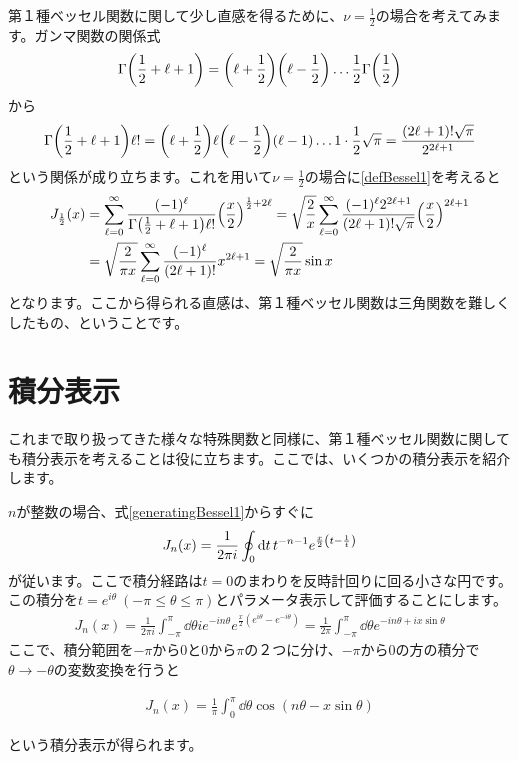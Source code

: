 \documentclass[report,paper=a4, fontsize=12pt, line_length=16cm, number_of_lines=33,dvipdfmx]{jlreq}
\newenvironment{important}{\begin{tcolorbox}[
  colback = white,
  colframe = red!35,
  boxrule = 2mm,
  fonttitle = \bfseries,
  after = \noindent] }{\end{tcolorbox}}
\numberwithin{equation}{section}
\begin{document}
第１種ベッセル関数に関して少し直感を得るために、$\nu=\frac12$の場合を考えてみます。ガンマ関数の関係式
\begin{align}
  \Gamma\qty(\frac12+\ell+1)=\qty(\ell+\frac12)\qty(\ell-\frac12)\dots \frac12 \Gamma\qty(\frac12)
\end{align}
から
\begin{align}
  \Gamma\qty(\frac12+\ell+1)\ell!=\qty(\ell+\frac12)\ell\qty(\ell-\frac12)(\ell-1)\dots 1\cdot\frac12 \sqrt{\pi}
  =\frac{(2\ell+1)!\sqrt{\pi}}{2^{2\ell+1}}
\end{align}
という関係が成り立ちます。これを用いて$\nu=\frac12$の場合に\eqref{defBessel1}を考えると
\begin{align}
  J_{\frac12}(x)
  &=\sum_{\ell=0}^{\infty}\frac{(-1)^{\ell}}{\Gamma\qty(\frac12+\ell+1)\ell !}\qty(\frac{x}{2})^{\frac12+2\ell}
  =\sqrt{\frac{2}{x}}\sum_{\ell=0}^{\infty}\frac{(-1)^{\ell}2^{2\ell+1}}{(2\ell+1)!\sqrt{\pi}}\qty(\frac{x}{2})^{2\ell+1}\nonumber\\
  &=\sqrt{\frac{2}{\pi x}}\sum_{\ell=0}^{\infty}\frac{(-1)^{\ell}}{(2\ell+1)!}x^{2\ell+1}
  =\sqrt{\frac{2}{\pi x}}\sin x
\end{align}
となります。ここから得られる直感は、第１種ベッセル関数は三角関数を難しくしたもの、ということです。

\section{積分表示}
これまで取り扱ってきた様々な特殊関数と同様に、第１種ベッセル関数に関しても積分表示を考えることは役に立ちます。ここでは、いくつかの積分表示を紹介します。

$n$が整数の場合、式\eqref{generatingBessel1}からすぐに
\begin{align}
  J_n(x)=\frac{1}{2\pi i}\oint_{0}\dd{t}t^{-n-1}e^{\frac{x}{2}\qty(t-\frac{1}{t})}\label{bessel1oint}
\end{align}
が従います。ここで積分経路は$t=0$のまわりを反時計回りに回る小さな円です。この積分を$t=e^{i\theta}\ (-\pi\le \theta \le \pi)$とパラメータ表示して評価することにします。
\begin{align}
  J_n(x)
  =\frac{1}{2\pi i}\int_{-\pi}^{\pi}\dd{\theta}
  ie^{-in\theta}e^{\frac{x}{2}(e^{i\theta}-e^{-i\theta})}
  =\frac{1}{2\pi}\int_{-\pi}^{\pi}\dd{\theta}
  e^{-in\theta+ix\sin\theta}
\end{align}
ここで、積分範囲を$-\pi$から$0$と$0$から$\pi$の２つに分け、$-\pi$から$0$の方の積分で$\theta\to -\theta$の変数変換を行うと
\begin{important}
  \begin{align}
    J_n(x)=\frac{1}{\pi}\int_{0}^{\pi}\dd{\theta}
    \cos(n\theta-x\sin\theta)
  \end{align}
\end{important}
という積分表示が得られます。
\end{document}
